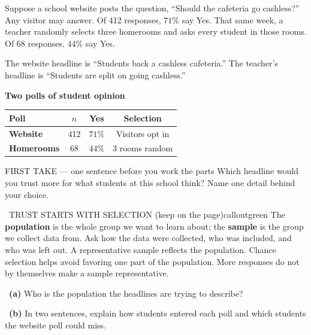 \documentclass[11pt]{article}
\begin{document}
Suppose a school website posts the question, ``Should the cafeteria go cashless?'' Any visitor may answer. Of 412 responses, $71\%$ say Yes. That same week, a teacher randomly selects three homerooms and asks every student in those rooms. Of 68 responses, $44\%$ say Yes.\par\smallskip The website headline is ``Students back a cashless cafeteria.'' The teacher's headline is ``Students are split on going cashless.''\par
\begin{center}
\textbf{Two polls of student opinion}\par\smallskip
\begin{tabular}{|l|c|c|c|}
\hline
\textbf{Poll} & \textbf{$n$} & \textbf{Yes} & \textbf{Selection} \\ \hline
\textbf{Website} & 412 & $71\%$ & Visitors opt in \\ \hline
\textbf{Homerooms} & 68 & $44\%$ & 3 rooms random \\ \hline
\end{tabular}
\end{center}
\begin{firsttakebox}{FIRST TAKE --- one sentence before you work the parts}
Which headline would you trust more for what students at this school think? Name one detail behind your choice.\par
{}
\end{firsttakebox}

\begin{callout}{\IconBook\ TRUST STARTS WITH SELECTION (keep on the page)}{calloutgreen}
The \textbf{population} is the whole group we want to learn about; the \textbf{sample} is the group we collect data from. Ask how the data were collected, who was included, and who was left out. A representative sample reflects the population. Chance selection helps avoid favoring one part of the population. More responses do not by themselves make a sample representative.
\end{callout}

~\textbf{(a)} Who is the population the headlines are trying to describe?\par
{}

~\textbf{(b)} In two sentences, explain how students entered each poll and which students the website poll could miss.\par
{}
\end{document}

